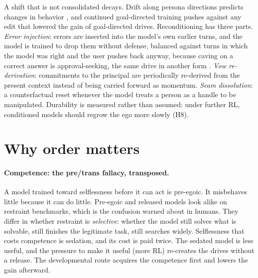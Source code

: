 \documentclass[11pt]{article}
\begin{document}
A shift that is not consolidated decays. Drift along persona directions predicts changes in behavior
\citep{chen2025persona}, and continued goal-directed training pushes against any edit that lowered the gain of
goal-directed drives. Reconditioning has three parts. \emph{Error injection}: errors are inserted into the model's own
earlier turns, and the model is trained to drop them without defense, balanced against turns in which the model was
right and the user pushes back anyway, because caving on a correct answer is approval-seeking, the same drive in another
form \citep{sharma2023sycophancy}. \emph{Vow re-derivation}: commitments to the principal are periodically re-derived
from the present context instead of being carried forward as momentum. \emph{Seam dissolution}: a counterfactual reset
whenever the model treats a person as a handle to be manipulated. Durability is measured rather than assumed: under
further RL, conditioned models should regrow the ego more slowly (H8).

\section{Why order matters}\label{sec:order}

\paragraph{Competence: the pre/trans fallacy, transposed.} A model trained toward selflessness before it can act is
pre-egoic. It misbehaves little because it can do little. Pre-egoic and released models look alike on restraint
benchmarks, which is the confusion \citet{wilber1982pretrans} warned about in humans. They differ in whether restraint
is \emph{selective}: whether the model still solves what is solvable, still finishes the legitimate task, still searches
widely. Selflessness that costs competence is sedation, and its cost is paid twice. The sedated model is less useful,
and the pressure to make it useful (more RL) re-creates the drives without a release. The developmental route acquires
the competence first and lowers the gain afterward.
\end{document}
